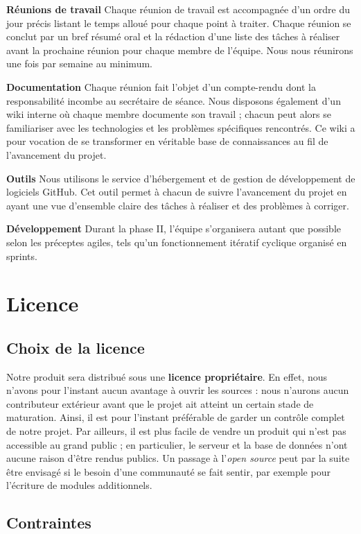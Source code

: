 \documentclass[10pt,twocolumn,a4paper,utf8x]{article}
\begin{document}
\textbf{Réunions de travail} Chaque réunion de travail est accompagnée
d'un ordre du jour précis listant le temps alloué pour chaque point à
traiter. Chaque réunion se conclut par un bref résumé oral et la
rédaction d'une liste des tâches à réaliser avant la prochaine réunion
pour chaque membre de l'équipe. Nous nous réunirons une fois par semaine
au minimum.

\textbf{Documentation} Chaque réunion fait l'objet d'un compte-rendu
dont la responsabilité incombe au secrétaire de séance. Nous disposons
également d'un wiki interne où chaque membre documente son travail ;
chacun peut alors se familiariser avec les technologies et les problèmes
spécifiques rencontrés. Ce wiki a pour vocation de se transformer en
véritable base de connaissances au fil de l'avancement du projet.

\textbf{Outils} Nous utilisons le service d'hébergement et de gestion de
développement de logiciels GitHub. Cet outil permet à chacun de suivre
l'avancement du projet en ayant une vue d'ensemble claire des tâches à
réaliser et des problèmes à corriger.

\textbf{Développement} Durant la phase II, l'équipe s'organisera autant
que possible selon les préceptes agiles, tels qu'un fonctionnement
itératif cyclique organisé en sprints.

\section{Licence}

\subsection{Choix de la licence}

Notre produit sera distribué sous une \textbf{licence propriétaire}. En
effet, nous n'avons pour l'instant aucun avantage à ouvrir les sources :
nous n'aurons aucun contributeur extérieur avant que le projet ait
atteint un certain stade de maturation. Ainsi, il est pour l'instant
préférable de garder un contrôle complet de notre projet. Par ailleurs,
il est plus facile de vendre un produit qui n'est pas accessible au
grand public ; en particulier, le serveur et la base de données n'ont
aucune raison d'être rendus publics. Un passage à l'\emph{open source}
peut par la suite être envisagé si le besoin d'une communauté se fait
sentir, par exemple pour l'écriture de modules additionnels.

\subsection{Contraintes}
\end{document}
